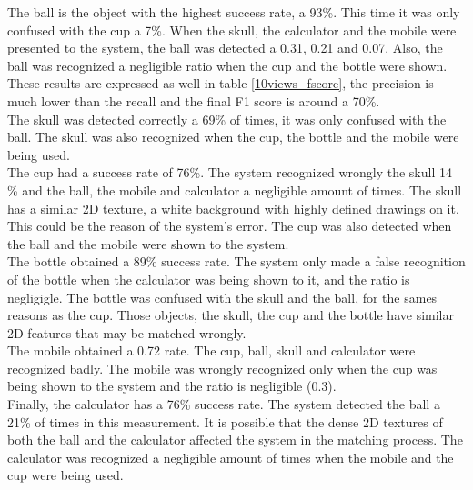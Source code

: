 	The ball is the object with the highest success rate, a 93\%. 
	This time it was only confused with the cup a 7\%. 
	When the skull, the calculator and the mobile were presented to the system, the ball was detected a 0.31, 0.21 and 0.07. 
	Also, the ball was recognized a negligible ratio when the cup and the bottle were shown. 
	These results are expressed as well in table \ref{10views_fscore}, the precision is much lower than the recall and the final F1 score is around a 70\%. 
	\\
	
	The skull was detected correctly a 69\% of times, it was only confused with the ball. %
	The skull was also recognized when the cup, the bottle and the mobile were being used. 
	\\

	The cup had a success rate of 76\%. 
	The system recognized wrongly the skull 14 \% and the ball, the mobile and calculator a negligible amount of times. 
	The skull has a similar 2D texture, a white background with highly defined drawings on it. 
	This could be the reason of the system's error. 
	The cup was also detected when the ball and the mobile were shown to the system. 
	\\

	The bottle obtained a 89\% success rate. 
	The system only made a false recognition of the bottle when the calculator was being shown to it, and the ratio is negligigle. 
	The bottle was confused with the skull and the ball, for the sames reasons as the cup. 
	Those objects, the skull, the cup and the bottle have similar 2D features that may be matched wrongly. 
	\\

	The mobile obtained a 0.72 rate. 
	The cup, ball, skull and calculator were recognized badly. 
	The mobile was wrongly recognized only when the cup was being shown to the system and the ratio is negligible (0.3). 
	\\

	Finally, the calculator has a 76\% success rate. 
	The system detected the ball a 21\% of times in this measurement. 
	It is possible that the dense 2D textures of both the ball and the calculator affected the system in the matching process. 
	The calculator was recognized a negligible amount of times when the mobile and the cup were being used. 

